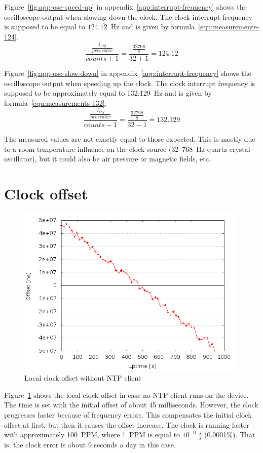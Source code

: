 Figure~\ref{fig:app-osc-speed-up} in appendix~\ref{app:interrupt-frequency} shows the oscilloscope output
when slowing down the clock.
The clock interrupt frequency
is supposed to be equal to $124.\overline{12}$~Hz and is given by formula~\ref{equ:measurements-124}.
\begin{equation}
\label{equ:measurements-124}
\frac{\frac{f_{asy}}{prescaler}}{counts + 1} = \frac{\frac{32768}{8}}{32+1} = 124.\overline{12}
\end{equation}

Figure~\ref{fig:app-osc-slow-down} in appendix~\ref{app:interrupt-frequency} shows the oscilloscope output
when speeding up the clock.
The clock interrupt frequency
is supposed to be approximately equal to 132.129~Hz and is given by formula~\ref{equ:measurements-132}.
\begin{equation}
\label{equ:measurements-132}
\frac{\frac{f_{asy}}{prescaler}}{counts - 1} = \frac{\frac{32768}{8}}{32-1} \doteq 132.129
\end{equation}

The measured values are not exactly equal to those expected.
This is mostly due to a room temperature influence on the clock source
(32~768~Hz quartz crystal oscillator),
but it could also be air pressure or magnetic fields, etc.

\section{Clock offset}
\begin{figure}[H]
  \centering
  \includegraphics[width=11cm,keepaspectratio]{fig/no-ntp.png}
  \caption{Local clock offset without NTP client}
  \label{fig:measurements-no-ntp}
\end{figure}
Figure~\ref{fig:measurements-no-ntp} shows the local clock offset
in case no NTP client runs on the device.
The time is set with the initial offset of about 45 milliseconds.
However, the clock progresses faster because of frequency errors.
This compensates the initial clock offset at first,
but then it causes the offset increase.
The clock is running faster with approximately 100~PPM,
where 1~PPM is equal to $10^{-6}$ $\frac{s}{s}$ (0.0001\%).
That is, the clock error is about 9 seconds a day in this case.

